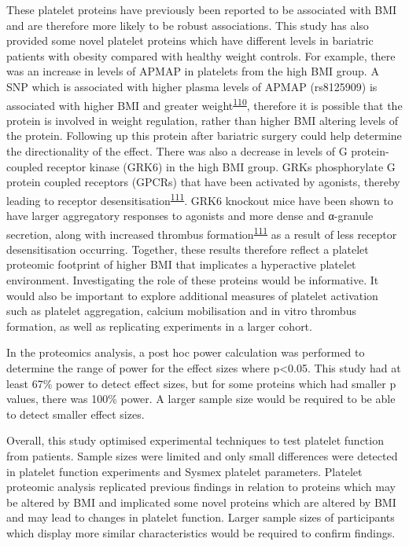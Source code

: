 \documentclass[11pt,twoside]{bristolthesis}
\begin{document}
These platelet proteins have previously been reported to be associated with BMI and are therefore more likely to be robust associations. This study has also provided some novel platelet proteins which have different levels in bariatric patients with obesity compared with healthy weight controls. For example, there was an increase in levels of APMAP in platelets from the high BMI group. A SNP which is associated with higher plasma levels of APMAP (rs8125909) is associated with higher BMI and greater weight\textsuperscript{\protect\hyperlink{ref-Liu2021}{110}}, therefore it is possible that the protein is involved in weight regulation, rather than higher BMI altering levels of the protein. Following up this protein after bariatric surgery could help determine the directionality of the effect. There was also a decrease in levels of G protein-coupled receptor kinase (GRK6) in the high BMI group. GRKs phosphorylate G protein coupled receptors (GPCRs) that have been activated by agonists, thereby leading to receptor desensitisation\textsuperscript{\protect\hyperlink{ref-Chaudhary2020}{111}}. GRK6 knockout mice have been shown to have larger aggregatory responses to agonists and more dense and α-granule secretion, along with increased thrombus formation\textsuperscript{\protect\hyperlink{ref-Chaudhary2020}{111}} as a result of less receptor desensitisation occurring. Together, these results therefore reflect a platelet proteomic footprint of higher BMI that implicates a hyperactive platelet environment. Investigating the role of these proteins would be informative. It would also be important to explore additional measures of platelet activation such as platelet aggregation, calcium mobilisation and in vitro thrombus formation, as well as replicating experiments in a larger cohort.

In the proteomics analysis, a post hoc power calculation was performed to determine the range of power for the effect sizes where p\textless0.05. This study had at least 67\% power to detect effect sizes, but for some proteins which had smaller p values, there was 100\% power. A larger sample size would be required to be able to detect smaller effect sizes.

Overall, this study optimised experimental techniques to test platelet function from patients. Sample sizes were limited and only small differences were detected in platelet function experiments and Sysmex platelet parameters. Platelet proteomic analysis replicated previous findings in relation to proteins which may be altered by BMI and implicated some novel proteins which are altered by BMI and may lead to changes in platelet function. Larger sample sizes of participants which display more similar characteristics would be required to confirm findings.
\end{document}
